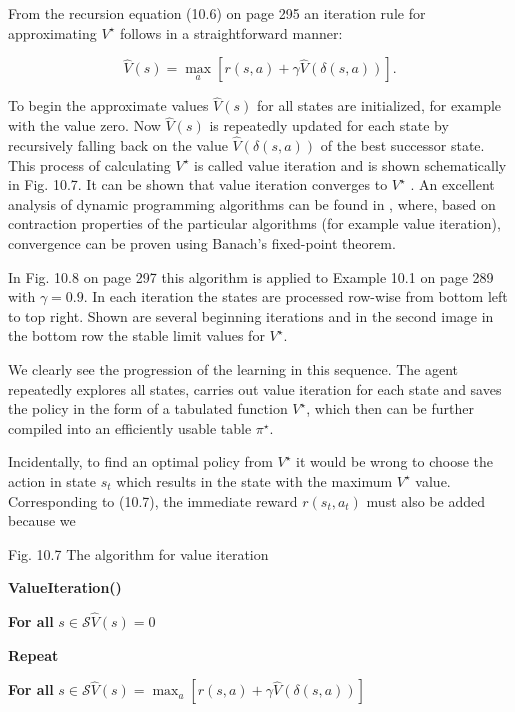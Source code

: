 \documentclass[10pt]{book}
\begin{document}
From the recursion equation (10.6) on page 295 an iteration rule for approximating $V^{\star}$ follows in a straightforward manner:

\begin{equation*}
\hat{V}(s)=\max _{a}[r(s, a)+\gamma \hat{V}(\delta(s, a))] . \tag{10.8}
\end{equation*}

To begin the approximate values $\hat{V}(s)$ for all states are initialized, for example with the value zero. Now $\hat{V}(s)$ is repeatedly updated for each state by recursively falling back on the value $\hat{V}(\delta(s, a))$ of the best successor state. This process of calculating $V^{\star}$ is called value iteration and is shown schematically in Fig. 10.7. It can be shown that value iteration converges to $V^{\star}$ \cite{sutton1998rl}. An excellent analysis of dynamic programming algorithms can be found in \cite{szepesvari2010rlalgorithms}, where, based on contraction properties of the particular algorithms (for example value iteration), convergence can be proven using Banach's fixed-point theorem.

In Fig. 10.8 on page 297 this algorithm is applied to Example 10.1 on page 289 with $\gamma=0.9$. In each iteration the states are processed row-wise from bottom left to top right. Shown are several beginning iterations and in the second image in the bottom row the stable limit values for $V^{\star}$.

We clearly see the progression of the learning in this sequence. The agent repeatedly explores all states, carries out value iteration for each state and saves the policy in the form of a tabulated function $V^{\star}$, which then can be further compiled into an efficiently usable table $\pi^{\star}$.

Incidentally, to find an optimal policy from $V^{\star}$ it would be wrong to choose the action in state $s_{t}$ which results in the state with the maximum $V^{\star}$ value. Corresponding to (10.7), the immediate reward $r\left(s_{t}, a_{t}\right)$ must also be added because we

Fig. 10.7 The algorithm for value iteration

\noindent\textbf{ValueIteration()}

\noindent\textbf{For all} $s \in \mathcal{S}$\quad $\hat{V}(s)=0$

\noindent\textbf{Repeat}

\noindent\textbf{For all} $s \in \mathcal{S}$\quad $\hat{V}(s)=\max _{a}[r(s, a)+\gamma \hat{V}(\delta(s, a))]$
\end{document}
